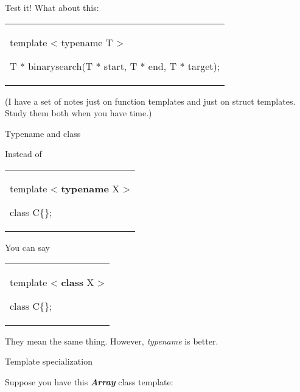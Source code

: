 \documentclass[
]{article}
\begin{document}
Test it! What about this:

\begin{longtable}[]{@{}
  >{\raggedright\arraybackslash}p{}@{}}
\toprule\noalign{}
 \\
\midrule\noalign{}
\endhead
\bottomrule\noalign{}
\endlastfoot
template \textless{} typename T \textgreater{}

T * binarysearch(T * start, T * end, T * target); \\
\end{longtable}

(I have a set of notes just on function templates and just on struct
templates. Study them both when you have time.)

Typename and class

Instead of

\begin{longtable}[]{@{}
  >{\raggedright\arraybackslash}p{}@{}}
\toprule\noalign{}
 \\
\midrule\noalign{}
\endhead
\bottomrule\noalign{}
\endlastfoot
template \textless{} \textbf{typename} X \textgreater{}

class C\{\}; \\
\end{longtable}

You can say

\begin{longtable}[]{@{}
  >{\raggedright\arraybackslash}p{}@{}}
\toprule\noalign{}
 \\
\midrule\noalign{}
\endhead
\bottomrule\noalign{}
\endlastfoot
template \textless{} \textbf{class} X \textgreater{}

class C\{\}; \\
\end{longtable}

They mean the same thing. However, \emph{typename} is better.

Template specialization

Suppose you have this \emph{\textbf{Array}} class template:
\end{document}
